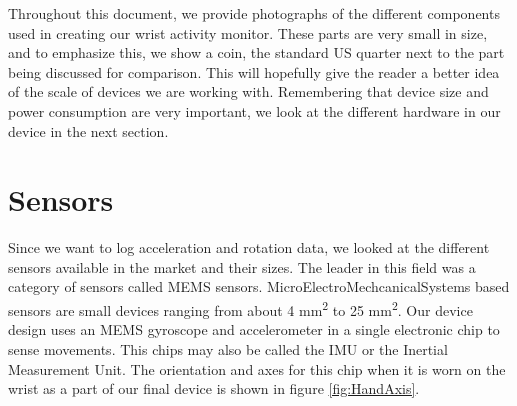 Throughout this document,
we provide photographs of the different components used in creating our wrist activity monitor.
These parts are very small in size,
and to emphasize this,
we show a coin,
the standard US quarter next to the part being discussed for comparison.
This will hopefully give the reader a better idea of the scale of devices we are working with.
Remembering that device size and power consumption are very important,
we look at the different hardware in our device in the next section.

\section{Sensors}
Since we want to log acceleration and rotation data, we looked at the different sensors available in the market and their sizes. The leader in this field was a category of sensors called MEMS sensors. MicroElectroMechcanicalSystems based sensors are small devices ranging from about 4 mm\textsuperscript{2} to  25 mm\textsuperscript{2}. Our device design uses an MEMS gyroscope and accelerometer in a single electronic chip to sense movements. This chips may also be called the IMU or the Inertial Measurement Unit. The orientation and axes for this chip when it is worn on the wrist as a part of our final device is shown in figure \ref{fig:HandAxis}.

